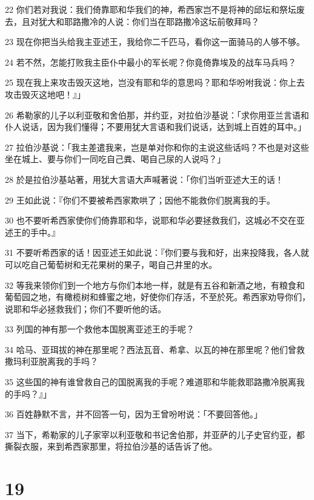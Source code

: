 \par 22 你们若对我说：我们倚靠耶和华我们的神，希西家岂不是将神的邱坛和祭坛废去，且对犹大和耶路撒冷的人说：你们当在耶路撒冷这坛前敬拜吗？
\par 23 现在你把当头给我主亚述王，我给你二千匹马，看你这一面骑马的人够不够。
\par 24 若不然，怎能打败我主臣仆中最小的军长呢？你竟倚靠埃及的战车马兵吗？
\par 25 现在我上来攻击毁灭这地，岂没有耶和华的意思吗？耶和华吩咐我说：你上去攻击毁灭这地吧！』」
\par 26 希勒家的儿子以利亚敬和舍伯那，并约亚，对拉伯沙基说：「求你用亚兰言语和仆人说话，因为我们懂得；不要用犹大言语和我们说话，达到城上百姓的耳中。」
\par 27 拉伯沙基说：「我主差遣我来，岂是单对你和你的主说这些话吗？不也是对这些坐在城上、要与你们一同吃自己粪、喝自己尿的人说吗？」
\par 28 於是拉伯沙基站著，用犹大言语大声喊著说：「你们当听亚述大王的话！
\par 29 王如此说：『你们不要被希西家欺哄了；因他不能救你们脱离我的手。
\par 30 也不要听希西家使你们倚靠耶和华，说耶和华必要拯救我们，这城必不交在亚述王的手中。』
\par 31 不要听希西家的话！因亚述王如此说：『你们要与我和好，出来投降我，各人就可以吃自己葡萄树和无花果树的果子，喝自己井里的水。
\par 32 等我来领你们到一个地方与你们本地一样，就是有五谷和新酒之地，有粮食和葡萄园之地，有橄榄树和蜂蜜之地，好使你们存活，不至於死。希西家劝导你们，说耶和华必拯救我们；你们不要听他的话。
\par 33 列国的神有那一个救他本国脱离亚述王的手呢？
\par 34 哈马、亚珥拔的神在那里呢？西法瓦音、希拿、以瓦的神在那里呢？他们曾救撒玛利亚脱离我的手吗？
\par 35 这些国的神有谁曾救自己的国脱离我的手呢？难道耶和华能救耶路撒冷脱离我的手吗？』」
\par 36 百姓静默不言，并不回答一句，因为王曾吩咐说：「不要回答他。」
\par 37 当下，希勒家的儿子家宰以利亚敬和书记舍伯那，并亚萨的儿子史官约亚，都撕裂衣服，来到希西家那里，将拉伯沙基的话告诉了他。

\chapter{19}

